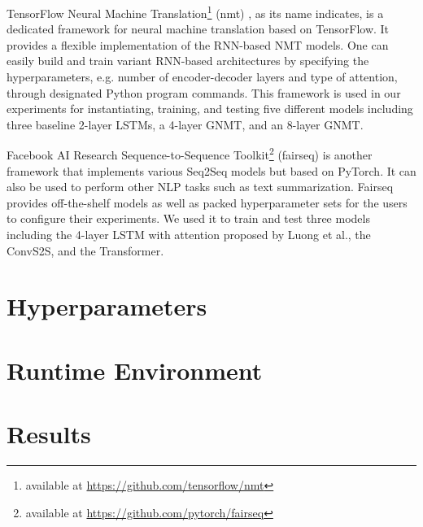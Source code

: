 TensorFlow Neural Machine Translation\footnote{available at \url{https://github.com/tensorflow/nmt}} (nmt) \cite{luong17}, as its name indicates, is a dedicated framework for neural machine translation based on TensorFlow. It provides a flexible implementation of the RNN-based NMT models. One can easily build and train variant RNN-based architectures by specifying the hyperparameters, e.g. number of encoder-decoder layers and type of attention, through designated Python program commands. This framework is used in our experiments for instantiating, training, and testing five different models including three baseline 2-layer LSTMs, a 4-layer GNMT, and an 8-layer GNMT.

Facebook AI Research Sequence-to-Sequence Toolkit\footnote{available at \url{https://github.com/pytorch/fairseq}} (fairseq) \cite{gehring2017convs2s} is another framework that implements various Seq2Seq models but based on PyTorch. It can also be used to perform other NLP tasks such as text summarization. Fairseq provides off-the-shelf models as well as packed hyperparameter sets for the users to configure their experiments. We used it to train and test three models including the 4-layer LSTM with attention proposed by Luong et al.\cite{Luong2015}, the ConvS2S, and the Transformer.


\section{Hyperparameters} \label{section:model parameters}



\section{Runtime Environment} \label{section:runtime environment}



\section{Results} \label{section:results}

